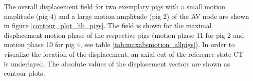 \documentclass[type=dr, dr=rernat, accentcolor=tud7b,colorbacktitle, bigchapter, openright, twoside, 12pt ]{tudthesis}
\begin{document}
\vspace*{-0.8cm}

The overall displacement field for two exemplary pigs with a small motion amplitude (pig 4) and a large motion amplitude (pig 2) of the 
AV node are shown in figure \ref{contour_plot_hb_pigs}. The field is shown for the maximal displacement motion phase of the respective pigs 
(motion phase 11 for pig 2 and motion phase 10 for pig 4, see table \ref{tab:maxabsmotion_allpigs}). 
In order to visualize the location of the displacement, an axial cut of the reference state CT is 
underlayed. The absolute values of the displacement vectors are shown as contour plots. 


\begin{figure}[H]
\centering
{}
\end{figure}
\end{document}
